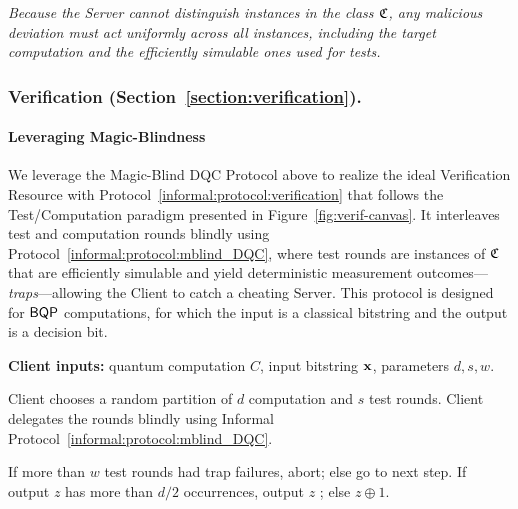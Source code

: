 \begin{center}
    \textit{
        Because the Server cannot distinguish instances in the class $\mathfrak C$, any malicious deviation must act uniformly across all instances, including the target computation and the efficiently simulable ones used for tests.
    }
\end{center}

\subsubsection{Verification (Section~\ref{section:verification}).}

\paragraph{Leveraging Magic-Blindness}
We leverage the Magic-Blind DQC Protocol above to realize the ideal Verification Resource with Protocol~\ref{informal:protocol:verification} that follows the Test/Computation paradigm presented in Figure~\ref{fig:verif-canvas}. It interleaves test and computation rounds blindly using Protocol~\ref{informal:protocol:mblind_DQC}, where test rounds are instances of $\mathfrak C$ that are efficiently simulable and yield deterministic measurement outcomes—\emph{traps}—allowing the Client to catch a cheating Server. This protocol is designed for $\textsf{BQP}$ computations, for which the input is a classical bitstring and the output is a decision bit.

\setcounter{informalprotocol}{4}
\begin{informalprotocol}
    \caption{Verified Delegated Quantum Computation}
\label{informal:protocol:verification}
\begin{algorithmic}[0]
  \State \textbf{Client inputs:} quantum computation $C$, input bitstring $\mathbf x$, parameters $d, s, w$.

  \State Client chooses a random partition of $d$ computation and $s$ test rounds.
  \State Client delegates the rounds blindly using Informal Protocol~\ref{informal:protocol:mblind_DQC}.

  \State If more than $w$ test rounds had trap failures, abort; else go to next step. 
  \State If output $z$ has more than $d/2$ occurrences, output $z$ ; else $z\oplus 1$. 

\end{algorithmic}
\end{informalprotocol}

